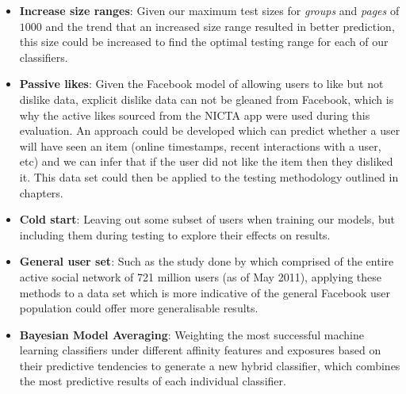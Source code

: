 \begin{itemize}
\item \textbf{Increase size ranges}: Given our maximum test sizes for \emph{groups} and \emph{pages} of $1000$  and the trend that an increased
size range resulted in better prediction, this size could be 
increased to find the optimal testing range for each of our classifiers.
\item \textbf{Passive likes}: Given the Facebook model of allowing users to like but not dislike data, explicit dislike data can not be 
gleaned from Facebook, which is why the active likes sourced from the NICTA app were used during this evaluation. An approach could be developed 
which can predict whether a user will have seen an item (online timestamps, recent interactions with a user, etc) and we can infer that if the 
user did not like the item then they disliked it. This data set could then be applied to the testing methodology outlined in chapters.
\item \textbf{Cold start}: Leaving out some subset of users when training our models, but including them during testing to explore their 
effects on results.
\item \textbf{General user set}: Such as the study done by \cite{jugand} which comprised of the entire active social network of 721 million users 
(as of May 2011), applying these methods to a data set which is more indicative of the general Facebook user population could offer more 
generalisable results.
\item \textbf{Bayesian Model Averaging}: Weighting the most successful machine learning classifiers under different affinity features and 
exposures based on their predictive tendencies to generate a new hybrid classifier, which combines the most predictive results of each individual classifier.
\end{itemize}

